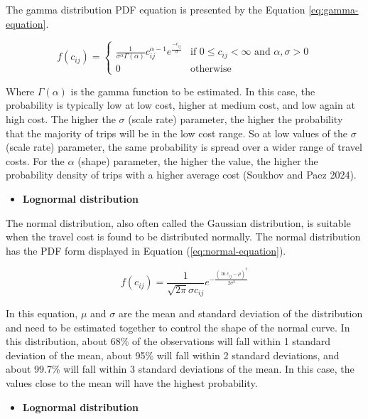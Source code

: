 \documentclass[preprint, 3p,
authoryear]{elsarticle} %
\providecommand{\tightlist}{%
  \setlength{\itemsep}{0pt}\setlength{\parskip}{0pt}}
\begin{document}
The gamma distribution PDF equation is presented by the Equation
\ref{eq:gamma-equation}.

\begin{equation}
f(c_{ij}) = 
   \begin{cases}
\frac{1}{\sigma^\alpha\Gamma(\alpha)} c_{ij}^{\alpha-1} e^{\frac{-c_{ij}}{\sigma}} & \text{if } 0 \leq c_{ij} <      \infty  \text{ and } \alpha, \sigma > 0 \\ 0 & \text{otherwise}
   \end{cases}
\label{eq:gamma-equation}
\end{equation}

Where \(\Gamma(\alpha)\) is the gamma function to be estimated. In this
case, the probability is typically low at low cost, higher at medium
cost, and low again at high cost. The higher the \(\sigma\) (scale rate)
parameter, the higher the probability that the majority of trips will be
in the low cost range. So at low values of the \(\sigma\) (scale rate)
parameter, the same probability is spread over a wider range of travel
costs. For the \(\alpha\) (shape) parameter, the higher the value, the
higher the probability density of trips with a higher average cost
(Soukhov and Paez 2024).

\begin{itemize}
\tightlist
\item
  \textbf{Lognormal distribution}
\end{itemize}

The normal distribution, also often called the Gaussian distribution, is
suitable when the travel cost is found to be distributed normally. The
normal distribution has the PDF form displayed in Equation
(\ref{eq:normal-equation}).

\begin{equation}
f(c_{ij}) = \frac{1}{\sqrt{2\pi} \sigma c_{ij}} e^{-\frac{(\ln c_{ij} - \mu)^2}{2\sigma^2}}
\label{eq:normal-equation}
\end{equation}

In this equation, \(\mu\) and \(\sigma\) are the mean and standard
deviation of the distribution and need to be estimated together to
control the shape of the normal curve. In this distribution, about 68\%
of the observations will fall within 1 standard deviation of the mean,
about 95\% will fall within 2 standard deviations, and about 99.7\% will
fall within 3 standard deviations of the mean. In this case, the values
close to the mean will have the highest probability.

\begin{itemize}
\tightlist
\item
  \textbf{Lognormal distribution}
\end{itemize}
\end{document}
